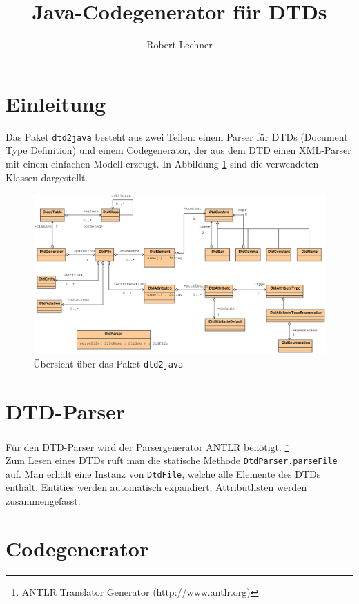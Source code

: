 \documentclass [a4paper,11pt] {scrartcl}
\author{Robert Lechner}
\title{Java-Codegenerator f{\"u}r DTDs}
\begin{document}
\maketitle
\section{Einleitung}
Das Paket \texttt{dtd2java} besteht aus zwei Teilen:
einem Parser f{\"u}r DTDs (Document Type Definition) und einem Codegenerator,
der aus dem DTD einen XML-Parser mit einem einfachen Modell erzeugt.
In Abbildung \ref{fig:classes} sind die verwendeten Klassen dargestellt.
\begin{figure}[h]
\centerline{\includegraphics[width=1.2 \linewidth]{classes.eps}}
\caption{{\"U}bersicht {\"u}ber das Paket \texttt{dtd2java}}
\label{fig:classes}
\end{figure}

\newpage
\section{DTD-Parser}
F{\"u}r den DTD-Parser wird der Parsergenerator \textsf{ANTLR} ben{\"o}tigt.
\footnote{ANTLR Translator Generator (http://www.antlr.org)}\\
Zum Lesen eines DTDs ruft man die statische Methode \texttt{DtdParser.parseFile} auf.
Man erh{\"a}lt eine Instanz von \texttt{DtdFile}, welche alle Elemente des DTDs enth{\"a}lt.
Entities werden automatisch expandiert; Attributlisten werden zusammengefasst.

\section{Codegenerator}
\end{document}
